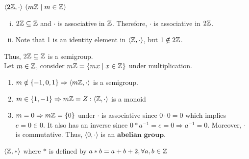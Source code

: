 \begin{exercise}
    $\langle 2\mathbb{Z}, \cdot \rangle$   $\qty(m\mathbb{Z} \mid m \in \mathbb{Z})$
\end{exercise}
\begin{solution} \phantom{blank}
    \begin{enumerate}[i.]
        \item $2\mathbb{Z} \subseteq \mathbb{Z}$ and $\cdot$ is associative in $\mathbb{Z}$. Therefore, $\cdot$ is associative in $2\mathbb{Z}$. 
        \item Note that 1 is an identity element in $\langle \mathbb{Z}, \cdot \rangle$, but $1 \notin 2\mathbb{Z}$.
    \end{enumerate}
    Thus, $2\mathbb{Z} \subseteq \mathbb{Z}$ is a semigroup. \\
    
    Let $m \in \mathbb{Z}$, consider $m\mathbb{Z} = \qty{mx \mid x \in \mathbb{Z}}$ under multiplication.
    \begin{myspace}
        \begin{enumerate}[label=\textbf{Case \arabic*:}]
            \item $m \notin \qty{-1, 0, 1} \Rightarrow \langle m\mathbb{Z}, \cdot \rangle$ is a semigroup.
            \item $m \in \qty{1, -1} \Rightarrow m\mathbb{Z} = Z: \langle \mathbb{Z}, \cdot \rangle$ is a monoid
            \item $m = 0 \Rightarrow m\mathbb{Z} = \qty{0}$ under $\cdot$ is associative since  $0 \cdot 0 = 0$ which implies $e = 0 \in \qty{0}$. It also has an inverse since $0 \ast a^{-1} = e = 0 \Rightarrow a^{-1} = 0$. Moreover, $\cdot$ is commutative.  Thus, $\langle \qty{0}, \cdot \rangle$ is an $\textbf{abelian group}$.
        \end{enumerate}
    \end{myspace}
\end{solution}

\begin{exercise}
    $\langle \mathbb{Z}, \ast \rangle$ where $\ast$ is defined by $a \ast b = a + b + 2, \forall a, b \in \mathbb{Z}$
\end{exercise}

